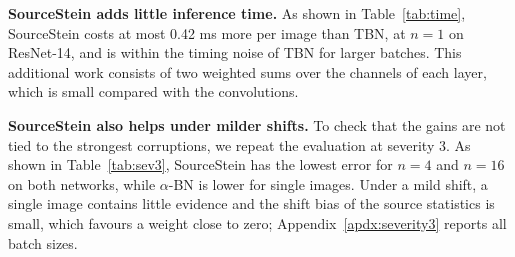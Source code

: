 \textbf{SourceStein adds little inference time.}
As shown in Table~\ref{tab:time}, SourceStein costs at most 0.42 ms more per image than TBN, at $n{=}1$ on ResNet-14, and is within the timing noise of TBN for larger batches.
This additional work consists of two weighted sums over the channels of each layer, which is small compared with the convolutions.

\begin{table}[t]
\centering
\renewcommand{\arraystretch}{0.9}
\caption{Inference time (ms per image) on one CPU thread for fog images at severity 5, averaged over three passes over 400 images.}
\label{tab:time}
\vspace{-10pt}
\end{table}

\textbf{SourceStein also helps under milder shifts.}
To check that the gains are not tied to the strongest corruptions, we repeat the evaluation at severity 3.
As shown in Table~\ref{tab:sev3}, SourceStein has the lowest error for $n{=}4$ and $n{=}16$ on both networks, while $\alpha$-BN is lower for single images.
Under a mild shift, a single image contains little evidence and the shift bias of the source statistics is small, which favours a weight close to zero; Appendix~\ref{apdx:severity3} reports all batch sizes.

